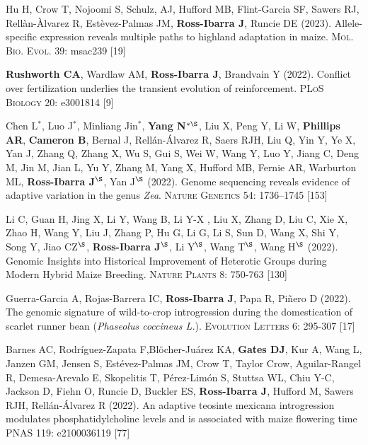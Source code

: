 \documentclass[letterpaper,10pt]{article}
\begin{document}
\begin{etaremune}
\item Hu H, Crow T, Nojoomi S, Schulz, AJ, Hufford MB, Flint-Garcia SF, Sawers RJ, Rell\`{a}n-\`{A}lvarez R, Est\`{e}vez-Palmas JM, \textbf{Ross-Ibarra J}, Runcie DE (2023). Allele-specific expression reveals multiple paths to highland adaptation in maize. \textsc{Mol. Bio. Evol.} 39: msac239
{} [19]\\

\item \textbf{Rushworth CA}, Wardlaw AM, \textbf{Ross-Ibarra J}, Brandvain Y (2022). Conflict over fertilization underlies the transient evolution of reinforcement. \textsc{PLoS Biology} 20: e3001814 %
{} [9]\\

\item Chen L$^*$, Luo J$^*$, Minliang Jin$^*$, \textbf{Yang N$^{*\S}$}, Liu X, Peng Y, Li W, \textbf{Phillips AR}, \textbf{Cameron B}, Bernal J, Rell\'{a}n-\'{A}lvarez R, Saers RJH, Liu Q, Yin Y, Ye X, Yan J, Zhang Q, Zhang X, Wu S, Gui S, Wei W, Wang Y, Luo Y, Jiang C, Deng M, Jin M, Jian L, Yu Y, Zhang M, Yang X, Hufford MB, Fernie AR, Warburton ML, \textbf{Ross-Ibarra J$^\S$}, Yan J$^\S$ (2022). Genome sequencing reveals evidence of adaptive variation in the genus \textit{Zea}. \textsc{Nature Genetics} 54: 1736–1745
{} [153]\\

\item Li C, Guan H, Jing X, Li Y, Wang B, Li Y-X , Liu X, Zhang D, Liu C, Xie X, Zhao H, Wang Y, Liu J, Zhang P, Hu G, Li G, Li S, Sun D, Wang X, Shi Y, Song Y, Jiao CZ$^\S$, \textbf{Ross-Ibarra J}$^\S$, Li Y$^\S$, Wang T$^\S$, Wang H$^\S$ (2022). Genomic Insights into Historical Improvement of Heterotic Groups during Modern Hybrid Maize Breeding. \textsc{Nature Plants} 8: 750-763
{} [130]\\

\item Guerra-Garcia A, Rojas-Barrera IC, \textbf{Ross-Ibarra J}, Papa R, Pi\~nero D (2022). The genomic signature of wild-to-crop introgression during the domestication of scarlet runner bean (\textit{Phaseolus coccineus L.}). \textsc{Evolution Letters} 6: 295-307 %
{} [17]\\

\item Barnes AC, Rodr\'iguez-Zapata F,Bl\"{o}cher-Ju\'arez KA, \textbf{Gates DJ}, Kur A,  Wang L, Janzen GM,  Jensen S, Est\'evez-Palmas JM, Crow T, Taylor Crow, Aguilar-Rangel R, Demesa-Arevalo E, Skopelitis T, P\'erez-Lim\'on S, Stuttsa WL, Chiu Y-C, Jackson D, Fiehn O, Runcie D, Buckler ES, \textbf{Ross-Ibarra J}, Hufford M, Sawers RJH, Rell\'an-\'Alvarez R (2022). An adaptive teosinte mexicana introgression modulates phosphatidylcholine levels and is associated with maize flowering time \textsc{PNAS} 119: e2100036119  %
{} [77]\\


\end{etaremune}
\end{document}
